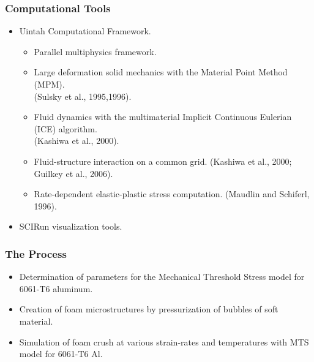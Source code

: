 \documentclass{beamer}
\begin{document}
    \begin{frame}
      \frametitle{Computational Tools}
      \begin{itemize}[<+-| alert@+>]
        \item Uintah Computational Framework.
          \begin{itemize}
            \item Parallel multiphysics framework.
            \item Large deformation solid mechanics with the
                  Material Point Method (MPM).\\
                  {\tiny (Sulsky et al., 1995,1996)}.
            \item Fluid dynamics with the multimaterial Implicit Continuous
                  Eulerian (ICE) algorithm. \\
                  {\tiny (Kashiwa et al., 2000)}.
            \item Fluid-structure interaction on a common grid.
                  {\tiny (Kashiwa et al., 2000; Guilkey et al., 2006)}.
            \item Rate-dependent elastic-plastic stress computation.
                  {\tiny (Maudlin and Schiferl, 1996)}.
          \end{itemize}
        \item SCIRun visualization tools. 
      \end{itemize}
    \end{frame}
      
    \begin{frame}
      \frametitle{The Process}
      \begin{itemize}[<+-| alert@+>]
        \item Determination of parameters for the Mechanical 
              Threshold Stress model for 6061-T6 aluminum.
        \item Creation of foam microstructures by pressurization
              of bubbles of soft material.
        \item Simulation of foam crush at various strain-rates and
              temperatures with MTS model for 6061-T6 Al.
      \end{itemize}
    \end{frame}
      
\end{document}
